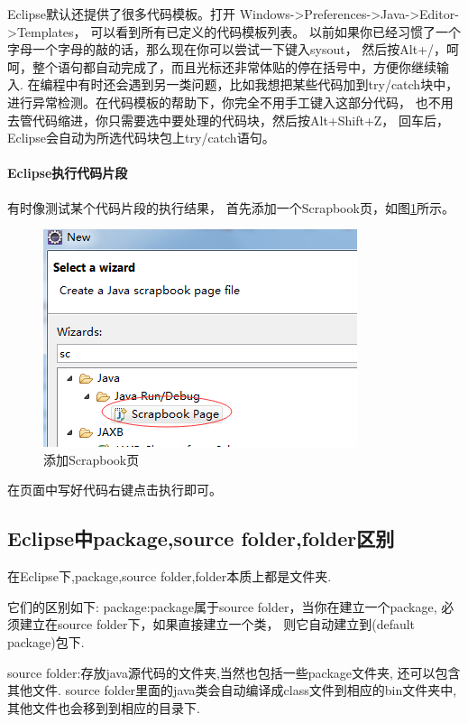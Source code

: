 \documentclass{book}
\begin{document}
Eclipse默认还提供了很多代码模板。打开 Windows->Preferences->Java->Editor->Templates，
可以看到所有已定义的代码模板列表。
以前如果你已经习惯了一个字母一个字母的敲的话，那么现在你可以尝试一下键入sysout，
然后按Alt+/，呵呵，整个语句都自动完成了，而且光标还非常体贴的停在括号中，方便你继续输入.
在编程中有时还会遇到另一类问题，比如我想把某些代码加到try/catch块中，
进行异常检测。在代码模板的帮助下，你完全不用手工键入这部分代码，
也不用去管代码缩进，你只需要选中要处理的代码块，然后按Alt+Shift+Z，
回车后， Eclipse会自动为所选代码块包上try/catch语句。

\paragraph{Eclipse执行代码片段}

有时像测试某个代码片段的执行结果，
首先添加一个Scrapbook页，如图\ref{fig:AddScrapbookPage}所示。

\begin{figure}[htbp]
	\centering
	\includegraphics[scale=0.6]{AddScrapbookPage.png}
	\caption{添加Scrapbook页}
	\label{fig:AddScrapbookPage}
\end{figure}

在页面中写好代码右键点击执行即可。


\subsection{Eclipse中package,source folder,folder区别}

在Eclipse下,package,source folder,folder本质上都是文件夹.

它们的区别如下: 
package:package属于source folder，当你在建立一个package,
必须建立在source folder下，如果直接建立一个类，
则它自动建立到(default package)包下.

source folder:存放java源代码的文件夹,当然也包括一些package文件夹,
还可以包含其他文件. 
source folder里面的java类会自动编译成class文件到相应的bin文件夹中,
其他文件也会移到到相应的目录下.
\end{document}
